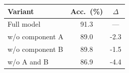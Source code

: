 \begin{tabular}{lS[table-format=2.1]S[table-format=+1.1]}
  \toprule
  Variant                & {Acc.\ (\%)} & {$\Delta$} \\
  \midrule
  Full model             & 91.3         & {---}      \\
  \quad w/o component A  & 89.0         & -2.3       \\
  \quad w/o component B  & 89.8         & -1.5       \\
  \quad w/o A and B      & 86.9         & -4.4       \\
  \bottomrule
\end{tabular}
